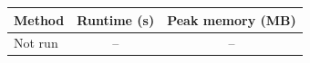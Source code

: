 \begin{tabular}{lcc}
\toprule
Method & Runtime (s) & Peak memory (MB) \\ 
\midrule
Not run & -- & -- \\
\bottomrule
\end{tabular}
